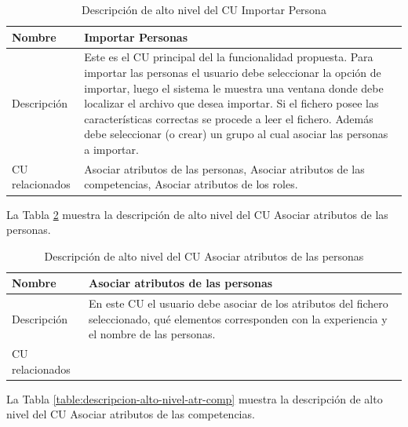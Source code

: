 \begin{table}[H]
	\centering
	\caption{Descripción de alto nivel del CU Importar Persona} \label{table:descripcion-alto-nivel-importar}
	\begin{tabular}{ | l | p{10cm} |}
		\toprule
		Nombre & Importar Personas \\ \midrule
		Descripción & Este es el CU principal del la funcionalidad propuesta. Para importar las personas el usuario debe seleccionar la opción de importar, luego el sistema le muestra una ventana donde debe localizar el archivo que desea importar. Si el fichero posee las características correctas se procede a leer el fichero. Además debe seleccionar (o crear) un grupo al cual asociar las personas a importar.\\ \hline
		CU relacionados & Asociar atributos de las personas, Asociar atributos de las competencias, Asociar atributos de los roles.\\ \bottomrule
	\end{tabular}
\end{table}

La Tabla \ref{table:descripcion-alto-nivel-atr-pers} muestra la descripción de alto nivel del CU Asociar atributos de las personas.

\begin{table}[H]
	\centering
	\caption{Descripción de alto nivel del CU Asociar atributos de las personas} \label{table:descripcion-alto-nivel-atr-pers}
	\begin{tabular}{ | l | p{10cm} |}
		\toprule
		Nombre          & Asociar atributos de las personas                                                                                                                                                \\ \midrule
		Descripción     & En este CU el usuario debe asociar de los atributos del fichero seleccionado, qué elementos corresponden con la experiencia y el nombre de las personas. \\ \hline
		CU relacionados &  \\ \bottomrule
	\end{tabular}
\end{table}

La Tabla \ref{table:descripcion-alto-nivel-atr-comp} muestra la descripción de alto nivel del CU Asociar atributos de las competencias.

